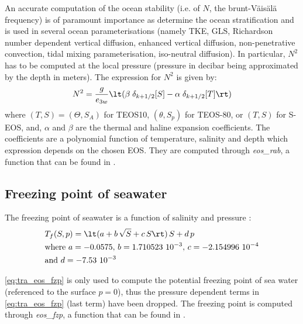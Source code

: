 \documentclass[../main/NEMO_manual]{subfiles}
\begin{document}
An accurate computation of the ocean stability (i.e. of $N$, the brunt-V\"{a}is\"{a}l\"{a} frequency) is of
paramount importance as determine the ocean stratification and is used in several ocean parameterisations
(namely TKE, GLS, Richardson number dependent vertical diffusion, enhanced vertical diffusion,
non-penetrative convection, tidal mixing  parameterisation, iso-neutral diffusion).
In particular, $N^2$ has to be computed at the local pressure
(pressure in decibar being approximated by the depth in meters).
The expression for $N^2$  is given by: 
\[
  N^2 = \frac{g}{e_{3w}} \lt( \beta \; \delta_{k + 1/2}[S] - \alpha \; \delta_{k + 1/2}[T] \rt)
\]
where $(T,S) = (\Theta,S_A)$ for TEOS10, $(\theta,S_p)$ for TEOS-80, or $(T,S)$ for S-EOS, and,
$\alpha$ and $\beta$ are the thermal and haline expansion coefficients.
The coefficients are a polynomial function of temperature, salinity and depth which expression depends on
the chosen EOS.
They are computed through \textit{eos\_rab}, a \fortran function that can be found in .

\subsection{Freezing point of seawater}
\label{subsec:TRA_fzp}

The freezing point of seawater is a function of salinity and pressure \citep{UNESCO1983}:
\begin{equation}
  \label{eq:tra_eos_fzp}
  \begin{split}
    &T_f (S,p) = \lt( a + b \, \sqrt{S} + c \, S \rt) \, S + d \, p \\
    &\text{where~} a = -0.0575, \, b = 1.710523~10^{-3}, \, c = -2.154996~10^{-4} \\ 
    &\text{and~} d = -7.53~10^{-3}
    \end{split}
\end{equation}

\autoref{eq:tra_eos_fzp} is only used to compute the potential freezing point of sea water
(\ie referenced to the surface $p = 0$),
thus the pressure dependent terms in \autoref{eq:tra_eos_fzp} (last term) have been dropped.
The freezing point is computed through \textit{eos\_fzp},
a \fortran function that can be found in .
\end{document}
